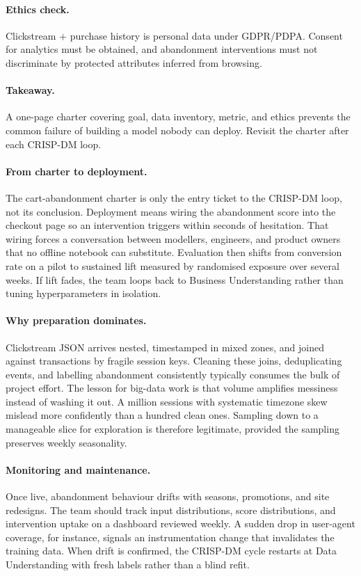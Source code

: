 \paragraph{Ethics check.} Clickstream + purchase history is personal data under GDPR/PDPA. Consent for analytics must be obtained, and abandonment interventions must not discriminate by protected attributes inferred from browsing.

\paragraph{Takeaway.} A one-page charter covering goal, data inventory, metric, and ethics prevents the common failure of building a model nobody can deploy. Revisit the charter after each CRISP-DM loop.
\paragraph{From charter to deployment.} The cart-abandonment charter is only the entry ticket to the CRISP-DM loop, not its conclusion.
Deployment means wiring the abandonment score into the checkout page so an intervention triggers within seconds of hesitation.
That wiring forces a conversation between modellers, engineers, and product owners that no offline notebook can substitute.
Evaluation then shifts from conversion rate on a pilot to sustained lift measured by randomised exposure over several weeks.
If lift fades, the team loops back to Business Understanding rather than tuning hyperparameters in isolation.
\paragraph{Why preparation dominates.} Clickstream JSON arrives nested, timestamped in mixed zones, and joined against transactions by fragile session keys.
Cleaning these joins, deduplicating events, and labelling abandonment consistently typically consumes the bulk of project effort.
The lesson for big-data work is that volume amplifies messiness instead of washing it out.
A million sessions with systematic timezone skew mislead more confidently than a hundred clean ones.
Sampling down to a manageable slice for exploration is therefore legitimate, provided the sampling preserves weekly seasonality.
\paragraph{Monitoring and maintenance.} Once live, abandonment behaviour drifts with seasons, promotions, and site redesigns.
The team should track input distributions, score distributions, and intervention uptake on a dashboard reviewed weekly.
A sudden drop in user-agent coverage, for instance, signals an instrumentation change that invalidates the training data.
When drift is confirmed, the CRISP-DM cycle restarts at Data Understanding with fresh labels rather than a blind refit.
